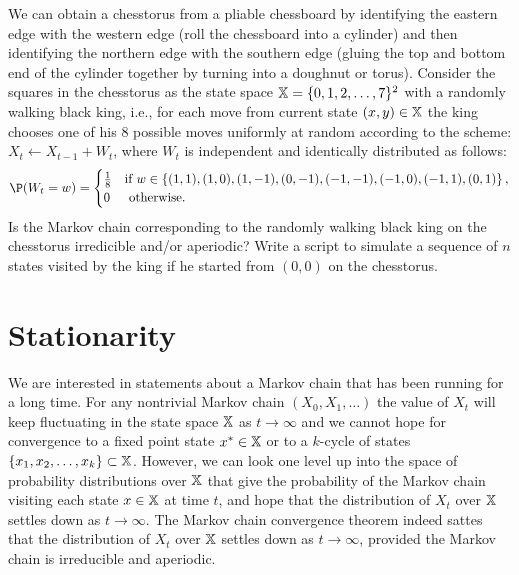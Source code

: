\begin{exercise}\label{EXR:KingRWChessTorus}
We can obtain a chesstorus from a pliable chessboard by identifying the eastern edge with the western edge (roll the chessboard into a cylinder) and then identifying the northern edge with the southern edge (gluing the top and bottom end of the cylinder together by turning into a doughnut or torus).  Consider the squares in the chesstorus as the state space $\mathbb{X} = \{ 0,1,2,\ldots,7\}^2$ with a randomly walking black king, i.e., for each move from current state $(x,y) \in \mathbb{X}$ the king chooses one of his $8$ possible moves uniformly at random according to the scheme: $X_t \gets X_{t-1}+ W_t$, where $W_t$ is independent and identically distributed as follows:
\[ 
\P(W_t = w) = 
\begin{cases}
\frac{1}{8} & \text{if } w \in \left\{ (1,1), (1,0), (1,-1), (0,-1), (-1,-1), (-1,0), (-1,1), (0,1) \right\} , \\
0 & \text{ otherwise}.
\end{cases}
\]
Is the Markov chain corresponding to the randomly walking black king on the chesstorus irredicible and/or aperiodic?  Write a \Matlab script to simulate a sequence of $n$ states visited by the king if he started from $(0,0)$ on the chesstorus.
\end{exercise}

\section{Stationarity}\label{S:Stationarity}

We are interested in statements about a Markov chain that has been running for a long time.  
For any nontrivial Markov chain $(X_0,X_1,\ldots)$ the value of $X_t$ will keep fluctuating in the state space $\mathbb{X}$ as $t \to \infty$ and we cannot hope for convergence to a fixed point state $x^* \in \mathbb{X}$ or to a $k$-cycle of states $\{x_1,x_2,\ldots,x_k\} \subset \mathbb{X}$.  However, we can look one level up into the space of probability distributions over $\mathbb{X}$ that give the probability of the Markov chain visiting each state $x \in \mathbb{X}$ at time $t$, and hope that the distribution of $X_t$ over $\mathbb{X}$ settles down as $t \to \infty$.  The Markov chain convergence theorem indeed sattes that the distribution of $X_t$ over $\mathbb{X}$ settles down as $t \to \infty$, provided the Markov chain is irreducible and aperiodic.

